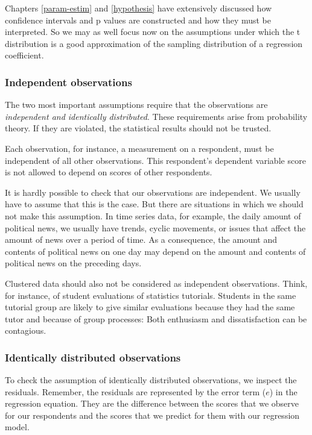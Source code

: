 \documentclass[a4paper]{book}
\theoremstyle{definition}
\theoremstyle{definition}
\theoremstyle{definition}
\theoremstyle{remark}
\begin{document}
Chapters \ref{param-estim} and \ref{hypothesis} have extensively
discussed how confidence intervals and p values are constructed and how
they must be interpreted. So we may as well focus now on the assumptions
under which the t distribution is a good approximation of the sampling
distribution of a regression coefficient.

\subsubsection{Independent observations}\label{independent-observations}

The two most important assumptions require that the observations are
\emph{independent and identically distributed}. These requirements arise
from probability theory. If they are violated, the statistical results
should not be trusted.

Each observation, for instance, a measurement on a respondent, must be
independent of all other observations. This respondent's dependent
variable score is not allowed to depend on scores of other respondents.

It is hardly possible to check that our observations are independent. We
usually have to assume that this is the case. But there are situations
in which we should not make this assumption. In time series data, for
example, the daily amount of political news, we usually have trends,
cyclic movements, or issues that affect the amount of news over a period
of time. As a consequence, the amount and contents of political news on
one day may depend on the amount and contents of political news on the
preceding days.

Clustered data should also not be considered as independent
observations. Think, for instance, of student evaluations of statistics
tutorials. Students in the same tutorial group are likely to give
similar evaluations because they had the same tutor and because of group
processes: Both enthusiasm and dissatisfaction can be contagious.

\subsubsection{Identically distributed
observations}\label{identically-distributed-observations}

To check the assumption of identically distributed observations, we
inspect the residuals. Remember, the residuals are represented by the
error term (\(e\)) in the regression equation. They are the difference
between the scores that we observe for our respondents and the scores
that we predict for them with our regression model.
\end{document}
